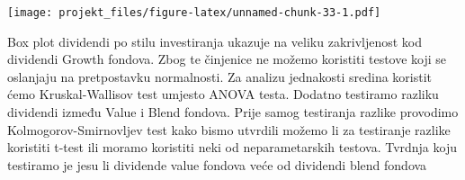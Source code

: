 \documentclass[
]{article}
\newenvironment{Shaded}{\begin{snugshade}}{\end{snugshade}}
\newcommand{\DataTypeTok}[1]{\textcolor[rgb]{0.13,0.29,0.53}{#1}}
\newcommand{\KeywordTok}[1]{\textcolor[rgb]{0.13,0.29,0.53}{\textbf{#1}}}
\newcommand{\NormalTok}[1]{#1}
\newcommand{\OperatorTok}[1]{\textcolor[rgb]{0.81,0.36,0.00}{\textbf{#1}}}
\newcommand{\StringTok}[1]{\textcolor[rgb]{0.31,0.60,0.02}{#1}}
\begin{document}
\begin{Shaded}
\end{Shaded}

\texttt{[image: projekt\_files/figure-latex/unnamed-chunk-33-1.pdf]}

Box plot dividendi po stilu investiranja ukazuje na veliku zakrivljenost
kod dividendi Growth fondova. Zbog te činjenice ne možemo koristiti
testove koji se oslanjaju na pretpostavku normalnosti. Za analizu
jednakosti sredina koristit ćemo Kruskal-Wallisov test umjesto ANOVA
testa. Dodatno testiramo razliku dividendi između Value i Blend fondova.
Prije samog testiranja razlike provodimo Kolmogorov-Smirnovljev test
kako bismo utvrdili možemo li za testiranje razlike koristiti t-test ili
moramo koristiti neki od neparametarskih testova. Tvrdnja koju testiramo
je jesu li dividende value fondova veće od dividendi blend fondova

\begin{Shaded}
\end{Shaded}
\end{document}
